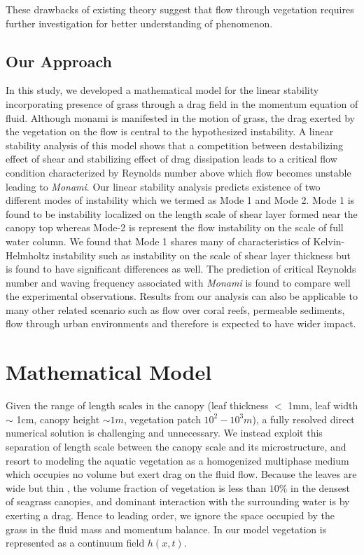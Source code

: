 \documentclass[12pt]{report}   %
\begin{document}
These drawbacks of existing theory suggest that flow through vegetation requires further investigation for better understanding of phenomenon.
\section{Our Approach}
In this study, we developed a mathematical model for the linear stability incorporating presence of grass through a drag field in the momentum equation of fluid. Although monami is manifested in the motion of grass, the drag exerted by the vegetation on the flow is central to the hypothesized instability. A linear stability analysis of this model shows that a competition between destabilizing effect of shear and stabilizing effect of drag dissipation leads to a critical flow condition characterized by Reynolds number above which flow becomes unstable leading to \textit{Monami}. Our linear stability analysis predicts existence of two different modes of instability which we termed as Mode 1 and Mode 2. Mode 1 is found to be instability localized on the length scale of shear layer formed near the canopy top whereas Mode-2 is represent the flow instability on the scale of full water column. We found that Mode 1 shares many of characteristics of Kelvin-Helmholtz instability such as instability on the scale of 
shear layer thickness but is found to have significant differences as well. The prediction of critical Reynolds number and waving frequency associated with \textit{Monami} is found to compare well the experimental observations. Results from our analysis can also be applicable to many other related scenario such as flow over coral reefs, permeable sediments, flow through urban environments and therefore is expected to have wider impact. 

%
\clearpage{\pagestyle{empty}\cleardoublepage}

\chapter{Mathematical Model}
Given the range of length scales in the canopy (leaf thickness $<$ 1mm, leaf width $\sim$ 1cm, canopy height $\sim 1m$, vegetation patch $10^2-10^3 m$), a fully resolved direct numerical solution is challenging and unnecessary. We instead exploit this separation of length scale between the canopy scale and its microstructure, and resort to modeling the aquatic vegetation as a homogenized multiphase medium which occupies no volume but exert drag on the fluid flow.
Because the leaves are wide but thin , the volume fraction of vegetation is less than $10\%$ \cite{chandler96} in the densest of seagrass canopies, and dominant interaction with the surrounding water is by exerting a drag. Hence to leading order, we ignore the space occupied by the grass in the fluid mass and momentum balance. In our model vegetation is represented as a continuum field $h(x,t)$. 
\end{document}
